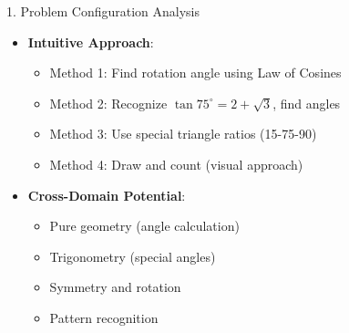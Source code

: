 \documentclass[12pt]{article}
\begin{document}
\begin{configbox}{1. Problem Configuration Analysis}
\begin{itemize}[leftmargin=*]
    \item \textbf{Intuitive Approach}: 
    \begin{itemize}
        \item Method 1: Find rotation angle using Law of Cosines
        \item Method 2: Recognize $\tan 75^\circ = 2+\sqrt{3}$, find angles
        \item Method 3: Use special triangle ratios (15-75-90)
        \item Method 4: Draw and count (visual approach)
    \end{itemize}
    
    \item \textbf{Cross-Domain Potential}: 
    \begin{itemize}
        \item Pure geometry (angle calculation)
        \item Trigonometry (special angles)
        \item Symmetry and rotation
        \item Pattern recognition
    \end{itemize}
\end{itemize}

\end{configbox}
\end{document}
